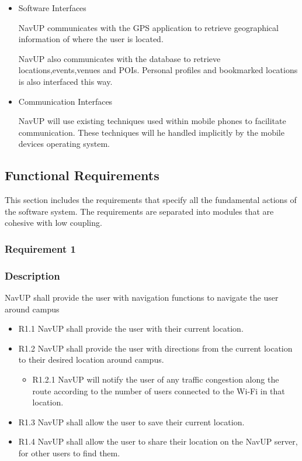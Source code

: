﻿\documentclass{article}
\begin{document}
\begin{itemize}
			\item Software Interfaces
			
			NavUP communicates with the GPS application to retrieve geographical information of where the user is located.
			
			NavUP also communicates with the database to retrieve locations,events,venues and POIs. Personal profiles and bookmarked locations is also interfaced this way.
			
			
			\item Communication Interfaces
			
			NavUP will use existing techniques used within mobile phones to facilitate communication. These techniques will he handled implicitly by the mobile devices operating system.
			
		\end{itemize}
    \subsection{Functional Requirements}
    This section includes the requirements that specify all the fundamental actions of the software system. The requirements are separated into modules that are cohesive with low coupling.
    
    	\subsubsection{Requirement 1}
    	
    	\subsubsection*{Description}
    	NavUP shall provide the user with navigation functions to navigate the user around campus
        \begin{itemize}
        \item R1.1 NavUP shall provide the user with their current location.
        \item R1.2 NavUP shall provide the user with directions from the current location to their desired location around campus.
            \begin{itemize}
                \item R1.2.1 NavUP will notify the user of any traffic congestion along the route according to the number of users connected to the Wi-Fi in that location.
            \end{itemize}
        \item R1.3 NavUP shall allow the user to save their current location.
        \item R1.4 NavUP shall allow the user to share their location on the NavUP server, for other users to find them.
        \end{itemize}
\end{document}
